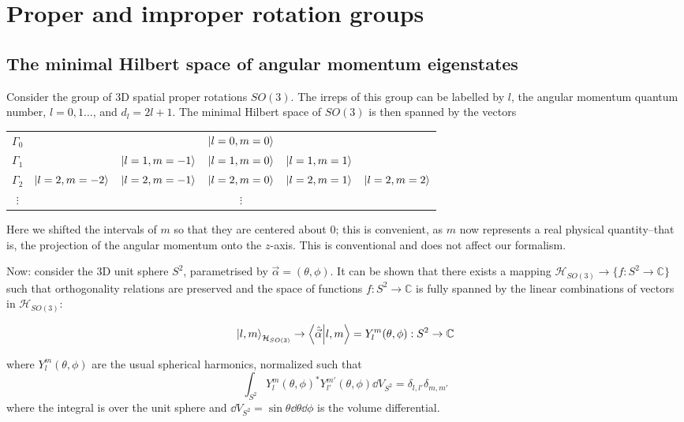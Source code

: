 \documentclass[12pt]{article}
\begin{document}
	
	\section{Proper and improper rotation groups}\label{example}
	\subsection{The minimal Hilbert space of angular momentum eigenstates}
	
	Consider the group of 3D spatial proper rotations $SO(3)$. The irreps of this group can be labelled by $l$, the angular momentum quantum number, $l=0,1\dots$, and $d_l=2l+1$. The minimal Hilbert space of $SO(3)$ is then spanned by the vectors
	
	\begin{center}
	\begin{tabular}{c|c c c c c}
	$\Gamma_0$ & & & $\ket{l=0, m=0}$ & &\\
	$\Gamma_1$ & & $\ket{l=1,m=-1}$ & $\ket{l=1,m=0}$ & $\ket{l=1,m=1}$ & \\
	$\Gamma_2$ & $\ket{l=2,m=-2}$ & $\ket{l=2,m=-1}$ & $\ket{l=2,m=0}$ & $\ket{l=2,m=1}$ & $\ket{l=2,m=2}$\\
	$\vdots$ & & & $\vdots$ & &
	\end{tabular}
	\end{center}
	
	Here we shifted the intervals of $m$ so that they are centered about $0$; this is convenient, as $m$ now represents a real physical quantity--that is, the projection of the angular momentum onto the $z$-axis. This is conventional and does not affect our formalism.
	
	Now: consider the 3D unit sphere $S^2$, parametrised by $\vec{\alpha}=(\theta, \phi)$. It can be shown that there exists a mapping $\mathcal{H}_{SO(3)}\to \{f:S^2\to\mathbb{C}\}$ such that orthogonality relations are preserved and the space of functions $f:S^2\to\mathbb{C}$ is fully spanned by the linear combinations of vectors in $\mathcal{H}_{SO(3)}$:
	
	$$\ket{l,m}_{\mathcal{H}_{SO(3)}}\to \braket{\hat{\vec{\alpha}}}{l,m}=Y_l^m(\theta, \phi):S^2\to\mathbb{C}$$
	
	where $Y_l^m(\theta, \phi)$ are the usual spherical harmonics, normalized such that
	$$\int_{S^2}Y_l^m(\theta, \phi)^*Y_{l'}^{m'}(\theta, \phi)\dd{V}_{S^2}=\delta_{l,l'}\delta_{m,m'}$$
	where the integral is over the unit sphere and $\dd{V}_{S^2}=\sin{\theta}\dd{\theta} \dd{\phi}$ is the volume differential.
	
\end{document}
